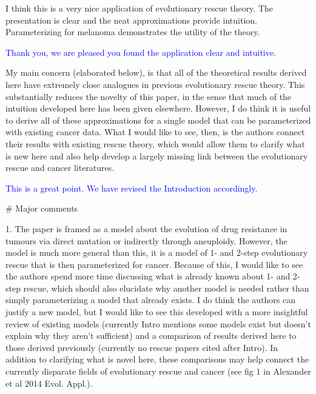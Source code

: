 \documentclass[12pt]{extarticle}
\begin{document}
I think this is a very nice application of evolutionary rescue theory. The presentation is clear and the neat approximations provide intuition. Parameterizing for melanoma demonstrates the utility of the theory.

\textcolor{blue}{
Thank you, we are pleased you found the application clear and intuitive.
} 

My main concern (elaborated below), is that all of the theoretical results derived here have extremely close analogues in previous evolutionary rescue theory. This substantially reduces the novelty of this paper, in the sense that much of the intuition developed here has been given elsewhere. However, I do think it is useful to derive all of these approximations for a single model that can be parameterized with existing cancer data. What I would like to see, then, is the authors connect their results with existing rescue theory, which would allow them to clarify what is new here and also help develop a largely missing link between the evolutionary rescue and cancer literatures.

\textcolor{blue}{This is a great point. We have revised the Introduction accordingly.}

$\#$ Major comments

1. The paper is framed as a model about the evolution of drug resistance in tumours via direct mutation or indirectly through aneuploidy. However, the model is much more general than this, it is a model of 1- and 2-step evolutionary rescue that is then parameterized for cancer. Because of this, I would like to see the authors spend more time discussing what is already known about 1- and 2-step rescue, which should also elucidate why another model is needed rather than simply parameterizing a model that already exists. I do think the authors can justify a new model, but I would like to see this developed with a more insightful review of existing models (currently Intro mentions some models exist but doesn't explain why they aren't sufficient) and a comparison of results derived here to those derived previously (currently no rescue papers cited after Intro). In addition to clarifying what is novel here, these comparisons may help connect the currently disparate fields of evolutionary rescue and cancer (see fig 1 in Alexander et al 2014 Evol. Appl.).
\end{document}
